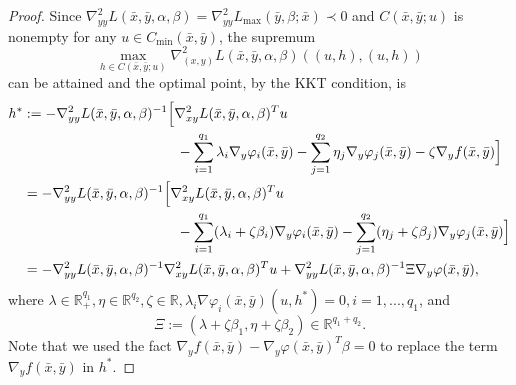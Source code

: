 \documentclass[11pt]{article}
\numberwithin{equation}{section}
\begin{document}
{\begin{proof}
 Since $\nabla_{yy}^2 L(\bar x,\bar y,\alpha,\beta)=\nabla_{yy}^2 L_{\max}(\bar y,\beta;\bar x) \prec 0$ and  $C(\bar x,\bar y;u)$ is nonempty for any $u \in C_{\min}(\bar x,\bar y)$, the supremum
\begin{equation*}
	\max_{h\in C(\bar x,\bar y;u) }\nabla^2_{(x,y)} L(\bar x,\bar y,\alpha,\beta)((u,h),(u,h))
\end{equation*}
can be attained and the optimal point, by the KKT condition, is 
\begin{equation}\label{equa4.18}
	\begin{aligned}
		h^* &:= -\nabla_{yy}^2 L(\bar x,\bar y,\alpha,\beta)^{-1} 
		\Bigl[ \nabla_{xy}^2L(\bar x,\bar y,\alpha,\beta)^Tu  \\
		&\quad\quad\quad\quad\quad\quad\quad\quad\quad\quad\quad -\sum_{i=1}^{q_1}\lambda_i \nabla_y \varphi_i (\bar x,\bar y) 
		-\sum_{j=1}^{q_2} \eta_j  \nabla_y \varphi_j(\bar x,\bar y) 
		-\zeta \nabla_y f(\bar x,\bar y)\Bigr] \\
		&= -\nabla_{yy}^2 L(\bar x,\bar y,\alpha,\beta)^{-1} 
		\Bigl[\nabla_{xy}^2L(\bar x,\bar y,\alpha,\beta)^Tu \\
		&\quad\quad\quad\quad\quad\quad\quad\quad\quad\quad\quad -\sum_{i=1}^{q_1}(\lambda_i+\zeta \beta_i)\nabla_y \varphi_i (\bar x,\bar y) 
		-\sum_{j=1}^{q_2}(\eta_j +\zeta \beta_j)\nabla_y \varphi_j(\bar x,\bar y)\Bigr] \\
		&= -\nabla_{yy}^2 L(\bar x,\bar y,\alpha,\beta)^{-1}\nabla_{xy}^2L(\bar x,\bar y,\alpha,\beta)^Tu + \nabla_{yy}^2 L(\bar x,\bar y,\alpha,\beta)^{-1} \Xi \nabla_y \varphi (\bar x,\bar y),
	\end{aligned}
\end{equation}
where $\lambda \in \mathbb{R}^{q_1}_+, \eta \in \mathbb{R}^{q_2}, \zeta\in \mathbb{R}, \lambda_i \nabla \varphi_i(\bar x,\bar y) (u,h^*)=0,i=1,...,q_1$, and
$$\Xi:=(\lambda+\zeta \beta_1,\eta +\zeta \beta_2)\in \mathbb{R}^{q_1+q_2}.$$
Note that we used the fact $\nabla_y f(\bar x,\bar y)- \nabla_y \varphi(\bar x,\bar y)^T\beta=0$ to replace the term $\nabla_y f(\bar x,\bar y)$ in $h^*$.
	

	
\end{proof}


}
\end{document}
